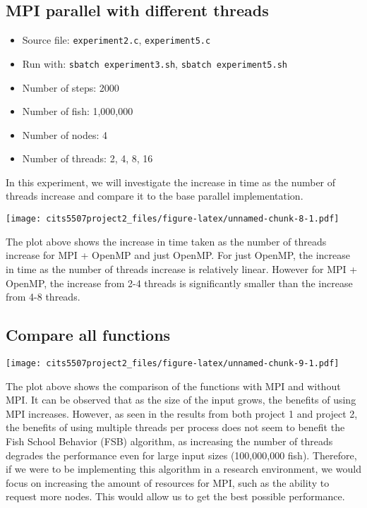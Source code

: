 \documentclass[
]{article}
\providecommand{\tightlist}{%
  \setlength{\itemsep}{0pt}\setlength{\parskip}{0pt}}
\begin{document}
\hypertarget{mpi-parallel-with-different-threads}{%
\subsection{MPI parallel with different
threads}\label{mpi-parallel-with-different-threads}}

\begin{itemize}
\tightlist
\item
  Source file: \texttt{experiment2.c}, \texttt{experiment5.c}
\item
  Run with: \texttt{sbatch\ experiment3.sh},
  \texttt{sbatch\ experiment5.sh}
\item
  Number of steps: 2000
\item
  Number of fish: 1,000,000
\item
  Number of nodes: 4
\item
  Number of threads: 2, 4, 8, 16
\end{itemize}

In this experiment, we will investigate the increase in time as the
number of threads increase and compare it to the base parallel
implementation.

\texttt{[image: cits5507project2\_files/figure-latex/unnamed-chunk-8-1.pdf]}

The plot above shows the increase in time taken as the number of threads
increase for MPI + OpenMP and just OpenMP. For just OpenMP, the increase
in time as the number of threads increase is relatively linear. However
for MPI + OpenMP, the increase from 2-4 threads is significantly smaller
than the increase from 4-8 threads.

\hypertarget{compare-all-functions}{%
\subsection{Compare all functions}\label{compare-all-functions}}

\texttt{[image: cits5507project2\_files/figure-latex/unnamed-chunk-9-1.pdf]}

The plot above shows the comparison of the functions with MPI and
without MPI. It can be observed that as the size of the input grows, the
benefits of using MPI increases. However, as seen in the results from
both project 1 and project 2, the benefits of using multiple threads per
process does not seem to benefit the Fish School Behavior (FSB)
algorithm, as increasing the number of threads degrades the performance
even for large input sizes (100,000,000 fish). Therefore, if we were to
be implementing this algorithm in a research environment, we would focus
on increasing the amount of resources for MPI, such as the ability to
request more nodes. This would allow us to get the best possible
performance.
\end{document}

